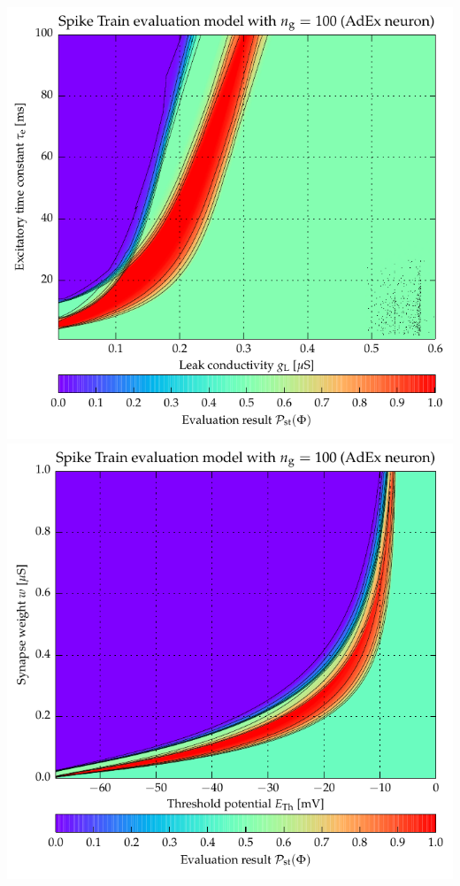 {\newpage
\vspace*{1.5cm}
\includegraphics[trim=0cm 1.75cm 0cm 0cm,clip]{media/appC/i8_ex_sc1_Train_N100_XgL_YtauE_pBin_Train_AdIfCondExp.pdf}\\
\vspace{0.5cm}
\includegraphics[trim=0cm 0cm 0cm 0.1cm,clip]{media/appC/i18_ex_sc1_Train_N100_XeTh_Yw_pBin_Train_AdIfCondExp.pdf}

}
